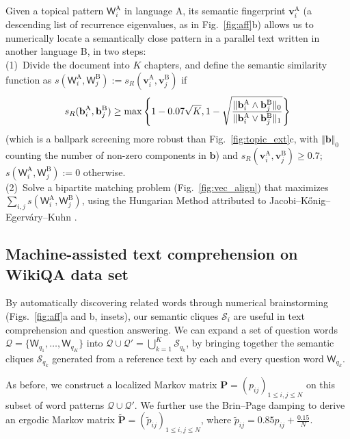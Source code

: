 \documentclass[10pt,journal,compsoc]{IEEEtran}
\begin{document}
Given a topical pattern $ \mathsf W_i^{\mathrm A}$ in language A, its semantic fingerprint $ \mathbf {v}_i^{\mathrm A}$ (a descending list of recurrence eigenvalues, as in Fig.~\ref{fig:aff}b) allows us to  numerically locate a semantically close pattern in a parallel text   written in  another language B, in two steps: \\ (1)~Divide the document  into $ K$ chapters, and define the semantic similarity function as  $ s(\mathsf W_i^{\mathrm A},\mathsf W_j^{\mathrm B}):=s_R({\mathbf v}_i^{\mathrm A},{\mathbf v}_j^{\mathrm B})$
  if \begin{align}  s_R(\mathbf b_i^{\mathrm A},\mathbf b_j^{\mathrm B})\geq\max\left\{1-0.07\sqrt{K},1-\sqrt{\frac{\Vert \smash[b]{\mathbf b_i^{\mathrm A}\wedge\mathbf b_j^{\mathrm B}}\Vert_0}{\Vert \smash[b]{\mathbf b_i^{\mathrm A}\vee\mathbf b_j^{\mathrm B}}\Vert_1}}\right\}\end{align} (which is a ballpark screening  more robust  than Fig.~\ref{fig:topic_ext}c, with  $ \Vert\mathbf b\Vert_0$ counting the number of non-zero components in $ \mathbf b$) and $ s_R({\mathbf v}_i^{\mathrm A},{\mathbf v}_j^{\mathrm B})\geq0.7$;  $ s(\mathsf W_i^{\mathrm A},\mathsf W_j^{\mathrm B}):=0$ otherwise.  \\ (2)~Solve a bipartite matching problem (Fig.~\ref{fig:vec_align}) that maximizes  $\sum_{i,j} s(\mathsf W_i^{\mathrm A},\mathsf W_j^{\mathrm B})$, using the Hungarian Method \cite{Kuhn1955} attributed to Jacobi--K\H{o}nig--Egerv\'ary--Kuhn \cite{Kuhn2012}.




\subsection{Machine-assisted text comprehension on WikiQA data set}

 By automatically discovering related words through numerical brainstorming (Figs.~\ref{fig:aff}a and b, insets),  our semantic cliques  $  \mathscr S_i$ are useful  in text comprehension and question answering. We can expand a set of question words $ \mathscr Q=\{\mathsf W_{q_1},\dots,\mathsf W_{q_K}\}$ into    $ \mathscr Q\cup\mathscr Q'=\bigcup_{k=1}^K\mathscr S_{q_k}$, by bringing together the semantic cliques $ \mathscr S_{q_k}$ generated from a reference text by each and every   question word $ \mathsf W_{q_k}$.


As before, we  construct a localized Markov matrix   $ \mathbf { P}=(p_{ij})_{1\leq i,j\leq N}$ on this subset of word patterns  $ \mathscr Q\cup\mathscr Q'$. We further use the Brin--Page damping \cite{BrinPage1998} to derive an ergodic Markov matrix $ \mathbf {\widetilde  P}=(\widetilde p_{ij})_{1\leq i,j\leq N}$, where $ \widetilde p_{ij}=0.85p_{ij}+\frac{0.15}{N}$.
\end{document}
